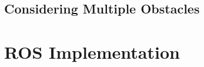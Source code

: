 \documentclass[a4paper,12pt]{article}
\begin{document}
		\subsection{Considering Multiple Obstacles}

	
	\section{ROS Implementation}

		

	
	
	


	\newpage
	\appendix
	\appendixpage
	\addappheadtotoc
	
\end{document}

